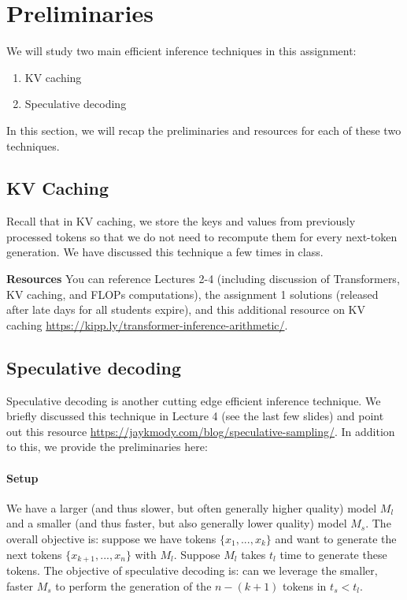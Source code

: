 \section{Preliminaries}

We will study two main efficient inference techniques in this assignment:
\begin{enumerate}
    \item KV caching
    \item Speculative decoding
\end{enumerate}

In this section, we will recap the preliminaries and resources for each of these two techniques.

\subsection{KV Caching} 
Recall that in KV caching, we store the keys and values from previously processed tokens so that we do not need to recompute them for every next-token generation. We have discussed this technique a few times in class.

\textbf{Resources} You can reference Lectures 2-4 (including discussion of Transformers, KV caching, and FLOPs computations), the assignment 1 solutions (released after late days for all students expire), and this additional resource on KV caching  \url{https://kipp.ly/transformer-inference-arithmetic/}.

\subsection{Speculative decoding}
Speculative decoding is another cutting edge efficient inference technique. We briefly discussed  this technique in Lecture 4 (see the last few slides) and point out this resource \url{https://jaykmody.com/blog/speculative-sampling/}. In addition to this, we provide the preliminaries here:

\paragraph{Setup} We have a larger (and thus slower, but often generally higher quality) model $M_{l}$ and a smaller (and thus faster, but also generally lower quality) model $M_{s}$. The overall objective is: suppose we have tokens $\{x_1, ..., x_k\}$ and want to generate the next tokens $\{x_{k+1}, ..., x_n\}$ with $M_{l}$. Suppose $M_{l}$ takes $t_{l}$ time to generate these tokens. The objective of speculative decoding is: can we leverage the smaller, faster $M_{s}$ to perform the generation of the $n-(k+1)$ tokens in $t_{s} < t_{l}$. 

